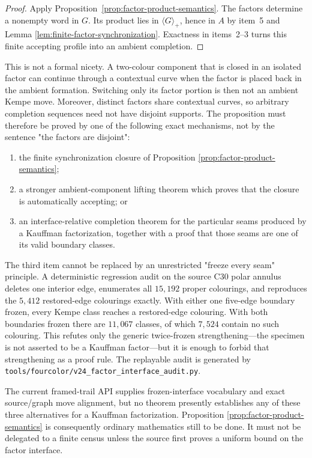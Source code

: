 \begin{proof}
Apply Proposition~\ref{prop:factor-product-semantics}.  The factors determine
a nonempty word in $G$.  Its product lies in
$\langle G\rangle_{+}$, hence in $A$ by item~5 and Lemma
\ref{lem:finite-factor-synchronization}.  Exactness in items~2--3 turns this
finite accepting profile into an ambient completion.
\end{proof}

This is not a formal nicety.  A two-colour component that is closed in an
isolated factor can continue through a contextual curve when the factor is
placed back in the ambient formation.  Switching only its factor portion is
then not an ambient Kempe move.  Moreover, distinct factors share contextual
curves, so arbitrary completion sequences need not have disjoint supports.
The proposition must therefore be proved by one of the following exact
mechanisms, not by the sentence "the factors are disjoint":
\begin{enumerate}
  \item the finite synchronization closure of Proposition
        \ref{prop:factor-product-semantics};
  \item a stronger ambient-component lifting theorem which proves that the
        closure is automatically accepting; or
  \item an interface-relative completion theorem for the particular seams
        produced by a Kauffman factorization, together with a proof that those
        seams are one of its valid boundary classes.
\end{enumerate}

The third item cannot be replaced by an unrestricted "freeze every seam"
principle.  A deterministic regression audit on the source C30 polar annulus
deletes one interior edge, enumerates all $15{,}192$ proper colourings, and
reproduces the $5{,}412$ restored-edge colourings exactly.  With either one
five-edge boundary frozen, every Kempe class reaches a restored-edge
colouring.  With both boundaries frozen there are $11{,}067$ classes, of
which $7{,}524$ contain no such colouring.  This refutes only the generic
twice-frozen strengthening---the specimen is not asserted to be a Kauffman
factor---but it is enough to forbid that strengthening as a proof rule.  The
replayable audit is generated by
\texttt{tools/fourcolor/v24\_factor\_interface\_audit.py}.

The current framed-trail API supplies frozen-interface vocabulary and exact
source/graph move alignment, but no theorem presently establishes any of
these three alternatives for a Kauffman factorization.  Proposition
\ref{prop:factor-product-semantics} is consequently ordinary mathematics
still to be done.  It must not be delegated to a finite census unless the
source first proves a uniform bound on the factor interface.

